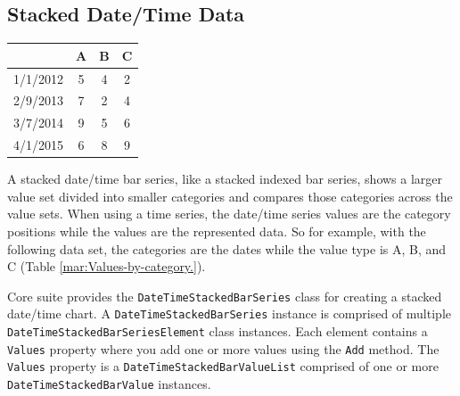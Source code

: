 \documentclass[american]{tufte-book}
\providecommand{\tabularnewline}{\\}
\numberwithin{equation}{section}
\numberwithin{figure}{section}
\begin{document}
{\subsection{Stacked Date/Time Data}
\begin{margintable}
\begin{tabular}{cccc}
\toprule 
 & A & B & C\tabularnewline
\midrule
1/1/2012 & 5 & 4 & 2\tabularnewline
2/9/2013 & 7 & 2 & 4\tabularnewline
3/7/2014 & 9 & 5 & 6\tabularnewline
4/1/2015 & 6 & 8 & 9\tabularnewline
\bottomrule
\end{tabular}
\vspace{3pt}
\caption{Values by category.}\label{mar:Values-by-category.}
\end{margintable}
A stacked date/time bar series, like a stacked indexed bar series,
shows a larger value set divided into smaller categories and compares
those categories across the value sets. When using a time series,
the date/time series values are the category positions while the values
are the represented data. So for example, with the following data
set, the categories are the dates while the value type is A, B, and
C (Table \ref{mar:Values-by-category.}).

Core suite provides the \texttt{DateTimeStackedBarSeries} class for
creating a stacked date/time chart. A \texttt{DateTimeStackedBarSeries}
instance is comprised of multiple \texttt{DateTimeStackedBarSeriesElement}
class instances. Each element contains a \texttt{Values} property
where you add one or more values using the \texttt{Add} method. The
\texttt{Values} property is a \texttt{DateTimeStackedBarValueList}
comprised of one or more \texttt{DateTimeStackedBarValue} instances.

}
\end{document}
